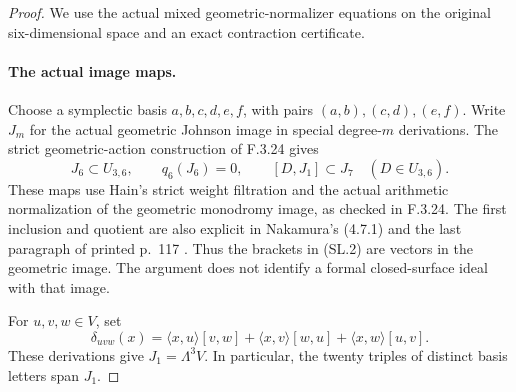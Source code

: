 \begin{proof}
We use the actual mixed geometric-normalizer equations on the original
six-dimensional space and an exact contraction certificate.

\paragraph{The actual image maps.}
Choose a symplectic basis $a,b,c,d,e,f$, with pairs $(a,b),(c,d),(e,f)$.
Write $J_m$ for the actual geometric Johnson image in special
degree-$m$ derivations. The strict geometric-action construction of
F.3.24 gives
\[
 J_6\subset U_{3,6},\qquad q_6(J_6)=0,\qquad
                  [D,J_1]\subset J_7\quad(D\in U_{3,6}).   \tag{SL.2}
\]
These maps use Hain's strict weight filtration and the actual arithmetic
normalization of the geometric monodromy image, as checked in F.3.24.
The first inclusion and quotient are also explicit in Nakamura's
(4.7.1) and the last paragraph of printed p.~117
\cite{AuditNakamura1996}. Thus the brackets in (SL.2) are vectors in
the geometric image. The argument does not identify a formal
closed-surface ideal with that image.

For $u,v,w\in V$, set
\[
 \delta_{uvw}(x)=\langle x,u\rangle[v,w]
              +\langle x,v\rangle[w,u]
              +\langle x,w\rangle[u,v].
\]
These derivations give $J_1=\Lambda^3V$. In particular, the twenty
triples of distinct basis letters span $J_1$.


\end{proof}
